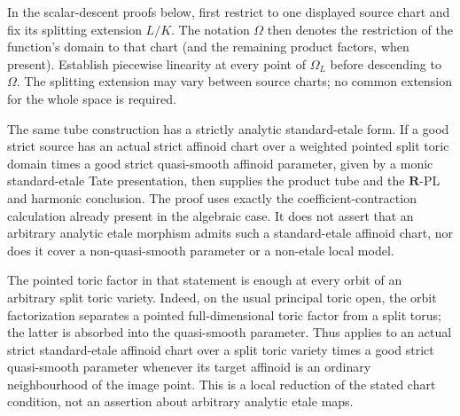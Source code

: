 In the scalar-descent proofs below, first restrict to one displayed source
chart and fix its splitting extension \(L/K\).  The notation \(\Omega\)
then denotes the restriction of the function's domain to that chart (and
the remaining product factors, when present).  Establish piecewise linearity
at every point of \(\Omega_L\) before descending to \(\Omega\).  The
splitting extension may vary between source charts; no common extension for
the whole space is required.

\begingroup
\makeatletter
\let\pzeroonesixetaletoric@original@nonumberplain\th@nonumberplain
\def\th@nonumberplain{%
  \pzeroonesixetaletoric@original@nonumberplain
  \def\@opargbegintheorem##1##2##3{%
    \item[\theorem@headerfont\hskip\labelsep ##3\theorem@separator]}}
\makeatother





\endgroup

The same tube construction has a strictly analytic standard-etale form.
If a good strict source has an actual strict affinoid chart over a weighted
pointed split toric domain times a good strict quasi-smooth affinoid
parameter, given by a monic standard-etale Tate presentation, then
 supplies the product tube
and the \(\mathbf R\)-PL and harmonic conclusion.  The proof uses exactly
the coefficient-contraction calculation already present in the algebraic
case.  It does not assert that an arbitrary analytic etale morphism admits
such a standard-etale affinoid chart, nor does it cover a non-quasi-smooth
parameter or a non-etale local model.

The pointed toric factor in that statement is enough at every orbit of an
arbitrary split toric variety.  Indeed, on the usual principal toric open,
the orbit factorization separates a pointed full-dimensional toric factor
from a split torus; the latter is absorbed into the quasi-smooth parameter.
Thus  applies to an actual
strict standard-etale affinoid chart over a split toric variety times a good
strict quasi-smooth parameter whenever its target affinoid is an ordinary
neighbourhood of the image point.  This is a local reduction of the stated
chart condition, not an assertion about arbitrary analytic etale maps.

